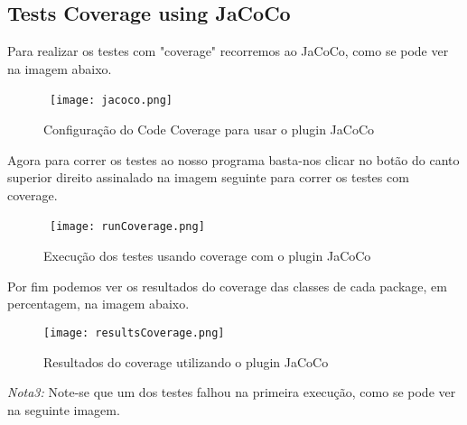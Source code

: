 \newpage
\subsection{Tests Coverage using JaCoCo}

\par Para realizar os testes com "coverage"  recorremos ao JaCoCo, como se pode ver na imagem abaixo.

\begin{figure}[H]

  \centering

  \hbox{\hspace{-8em}  \texttt{[image: jacoco.png]}}

  \caption {Configuração do Code Coverage para usar o  plugin JaCoCo}

  \label {fig42}

\end{figure}

\par Agora para correr os testes ao nosso programa basta-nos clicar no botão do canto superior direito assinalado na imagem seguinte para correr os testes com coverage.

\begin{figure}[H]

  \centering

  \hbox{\hspace{-10em} \texttt{[image: runCoverage.png]}}

  \caption {Execução dos testes usando coverage com o plugin JaCoCo}

  \label {fig43}

\end{figure}

\par Por fim podemos ver os resultados do coverage das classes de cada package, em percentagem, na imagem abaixo.

\begin{figure}[H]

  \centering

  \texttt{[image: resultsCoverage.png]}

  \caption {Resultados do coverage utilizando o plugin JaCoCo}

  \label {fig44}

\end{figure}

\par \textit{Nota3:} Note-se que um dos testes falhou na primeira execução, como se pode ver na seguinte imagem.

